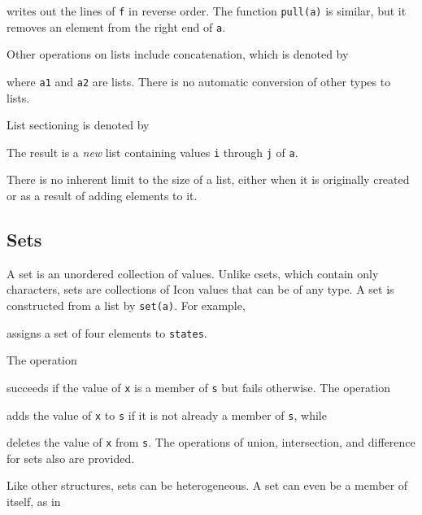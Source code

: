 \noindent writes out the lines of \texttt{f} in reverse order. The
function \texttt{pull(a)} is similar, but it removes an element from
the right end of \texttt{a}.

Other operations on lists include concatenation, which is denoted by


\noindent where \texttt{a1} and \texttt{a2} are lists. There is no
automatic conversion of other types to lists.

List sectioning is denoted by


The result is a \textit{new} list containing values \texttt{i} through
\texttt{j} of \texttt{a}.

There is no inherent limit to the size of a list, either when it is
originally created or as a result of adding elements to it.


\subsection{Sets}

A set is an unordered collection of values. Unlike csets, which
contain only characters, sets are collections of Icon values that can
be of any type. A set is constructed from a list by
\texttt{set(a)}. For example,


\noindent
assigns a set of four elements to \texttt{states}.

The operation


\noindent
succeeds if the value of \texttt{x} is a member of \texttt{s} but
fails otherwise. The operation


\noindent
adds the value of \texttt{x} to \texttt{s} if it is not already a
member of \texttt{s}, while


\noindent
deletes the value of \texttt{x} from \texttt{s}. The operations of
union, intersection, and difference for sets also are provided.

Like other structures, sets can be heterogeneous. A set can even be a
member of itself, as in


